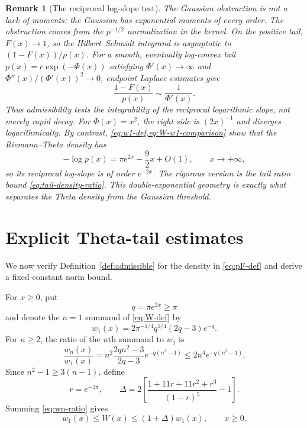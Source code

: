 \documentclass[11pt,reqno]{amsart}
\numberwithin{equation}{section}
\newtheorem{remark}[remark]{Remark}
\newcommand{\1}{\mathbf 1}
\begin{document}
\begin{remark}[The reciprocal log-slope test]\label{rem:log-slope}
The Gaussian obstruction is not a lack of moments: the Gaussian has
exponential moments of every order.  The obstruction comes from the
$p^{-1/2}$ normalization in the kernel.  On the positive tail,
$F(x)\to1$, so the Hilbert--Schmidt integrand is asymptotic to
$(1-F(x))/p(x)$.  For a smooth, eventually log-convex tail
$p(x)=c\exp(-\Phi(x))$ satisfying $\Phi'(x)\to\infty$ and
$\Phi''(x)/(\Phi'(x))^2\to0$, endpoint Laplace estimates give
\begin{equation}\label{eq:log-slope-diagnostic}
 \frac{1-F(x)}{p(x)}\sim\frac1{\Phi'(x)}.
\end{equation}
Thus admissibility tests the integrability of the reciprocal logarithmic
slope, not merely rapid decay.  For $\Phi(x)=x^2$, the right side is
$(2x)^{-1}$ and diverges logarithmically.  By contrast,
\cref{eq:w1-def,eq:W-w1-comparison} show that the Riemann--Theta density has
\begin{equation}\label{eq:theta-log-slope}
 -\log p(x)=\pi e^{2x}-\frac92x+O(1),
 \qquad x\to+\infty,
\end{equation}
so its reciprocal log-slope is of order $e^{-2x}$.  The rigorous version is
the tail ratio bound \eqref{eq:tail-density-ratio}.  This double-exponential geometry
is exactly what separates the Theta density from the Gaussian threshold.
\end{remark}

\section{Explicit Theta-tail estimates}

We now verify Definition~\ref{def:admissible} for the density in
\cref{eq:pF-def} and
derive a fixed-constant norm bound.

For $x\geq0$, put
\begin{equation}\label{eq:q-def}
 q=\pi e^{2x}\geq\pi
\end{equation}
and denote the $n=1$ summand of \eqref{eq:W-def} by
\begin{equation}\label{eq:w1-def}
 w_1(x)=2\pi^{-1/4}q^{5/4}(2q-3)e^{-q}.
\end{equation}
For $n\geq2$, the ratio of the $n$th summand to $w_1$ is
\begin{equation}\label{eq:wn-ratio}
 \frac{w_n(x)}{w_1(x)}
 =n^2\frac{2qn^2-3}{2q-3}e^{-q(n^2-1)}
 \leq2n^4e^{-q(n^2-1)}.
\end{equation}
Since $n^2-1\geq3(n-1)$, define
\begin{equation}\label{eq:Delta-def}
 r=e^{-3\pi},
 \qquad
 \Delta=2\left[
 \frac{1+11r+11r^2+r^3}{(1-r)^5}-1\right].
\end{equation}
Summing \eqref{eq:wn-ratio} gives
\begin{equation}\label{eq:W-w1-comparison}
 \boxed{w_1(x)\leq W(x)\leq(1+\Delta)w_1(x),
 \qquad x\geq0.}
\end{equation}
\end{document}
